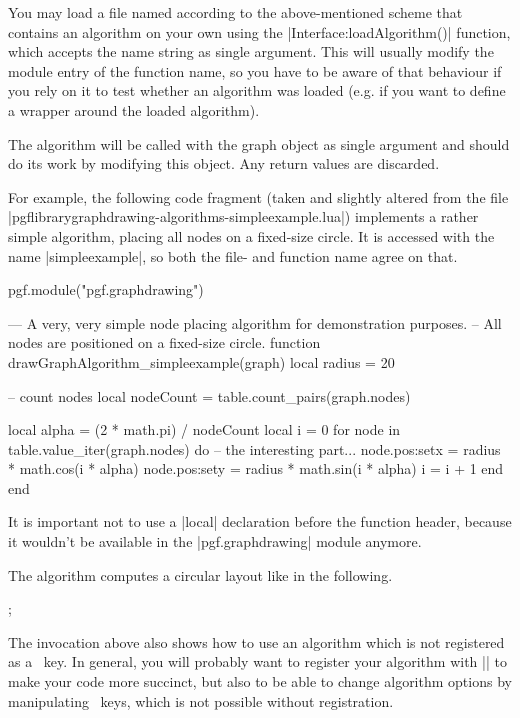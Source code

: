 You may load a file named according to the above-mentioned scheme that
contains an algorithm on your own using the |Interface:loadAlgorithm()|
function, which accepts the name string as single argument. This will
usually modify the module entry of the function name, so you have to
be aware of that behaviour if you rely on it to test whether an
algorithm was loaded (e.g. if you want to define a wrapper around the
loaded algorithm).

The algorithm will be called with the graph object as single argument
and should do its work by modifying this object. Any return
values are discarded.

For example, the following code fragment (taken and slightly altered
from the file |pgflibrarygraphdrawing-algorithms-simpleexample.lua|)
implements a rather simple algorithm, placing all nodes on a fixed-size
circle.  It is accessed with the name |simpleexample|, so both the
file- and function name agree on that.

\begin{codeexample}
pgf.module("pgf.graphdrawing")

--- A very, very simple node placing algorithm for demonstration purposes.
-- All nodes are positioned on a fixed-size circle.
function drawGraphAlgorithm_simpleexample(graph)
   local radius = 20

   -- count nodes
   local nodeCount = table.count_pairs(graph.nodes)

   local alpha = (2 * math.pi) / nodeCount
   local i = 0
   for node in table.value_iter(graph.nodes) do
      -- the interesting part...
      node.pos:set{x = radius * math.cos(i * alpha)}
      node.pos:set{y = radius * math.sin(i * alpha)}
      i = i + 1
   end
end
\end{codeexample}

It is important not to use a |local| declaration before the function
header, because it wouldn't be available in the |pgf.graphdrawing|
module anymore.

The algorithm computes a circular layout like in the following.

\begin{codeexample}[]
\tikzpicture [graphs/.cd, graph drawing engine, algorithm=simpleexample]
  ;
\endtikzpicture
\end{codeexample}

The invocation above also shows how to use an algorithm which is not
registered as a \tikzname\ key.  In general, you will probably want to
register your algorithm with |\tikzgraphsset| to make your code more
succinct, but also to be able to change algorithm options by manipulating
\tikzname\ keys, which is not possible without registration.  

